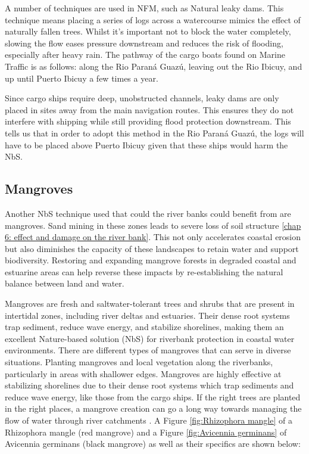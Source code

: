 A number of techniques are used in NFM, such as Natural leaky dams. This technique means placing a series of logs across a watercourse mimics the effect of naturally fallen trees. Whilst it’s important not to block the water completely, slowing the flow eases pressure downstream and reduces the risk of flooding, especially after heavy rain. The pathway of the cargo boats found on Marine Traffic is as follows: along the Rio Paraná Guazú, leaving out the Rio Ibicuy, and up until Puerto Ibicuy a few times a year. 

Since cargo ships require deep, unobstructed channels, leaky dams are only placed in sites away from the main navigation routes. This ensures they do not interfere with shipping while still providing flood protection downstream. This tells us that in order to adopt this method in the Rio Paraná Guazú, the logs will have to be placed above Puerto Ibicuy given that these ships would harm the NbS. 

\subsection{Mangroves}
Another NbS technique used that could the river banks could benefit from are mangroves.
Sand mining in these zones leads to severe loss of soil structure \ref{chap 6: effect and damage on the river bank}. This not only accelerates coastal erosion but also diminishes the capacity of these landscapes to retain water and support biodiversity. Restoring and expanding mangrove forests in degraded coastal and estuarine areas can help reverse these impacts by re-establishing the natural balance between land and water.

Mangroves are fresh and saltwater-tolerant trees and shrubs that are present in intertidal zones, including river deltas and estuaries. Their dense root systems trap sediment, reduce wave energy, and stabilize shorelines, making them an excellent Nature-based solution (NbS) for riverbank protection in coastal water environments. There are different types of mangroves that can serve in diverse situations. Planting mangroves and local vegetation along the riverbanks, particularly in areas with shallower edges. Mangroves are highly effective at stabilizing shorelines due to their dense root systems which trap sediments and reduce wave energy, like those from the cargo ships. If the right trees are planted in the right places, a mangrove creation can go a long way towards managing the flow of water through river catchments \autocite{ferreiraPropagulosMangueVermelho2024}. A Figure \ref{fig:Rhizophora mangle} of a Rhizophora mangle (red mangrove) and a Figure \ref{fig:Avicennia germinans} of Avicennia germinans (black mangrove) as well as their specifics are shown below:

